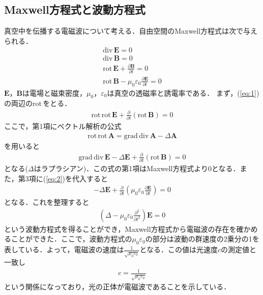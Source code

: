 \documentclass[a4j,10pt,oneside,openany]{jsbook}
\newcommand{\dive}{\mathrm{div}\,}  %
\newcommand{\grad}{\mathrm{grad}\,}  %
\newcommand{\rot}{\mathrm{rot}\,}  %
\newcommand{\vE}{\boldsymbol{E}}
\newcommand{\vB}{\boldsymbol{B}}
\newcommand{\del}{\partial}
\begin{document}
{\subsection{Maxwell方程式と波動方程式}
真空中を伝播する電磁波について考える．自由空間のMaxwell方程式は次で与えられる．
\begin{align}
  \dive \vE = 0\\
  \dive \vB = 0\\
  \rot\vE+\frac{\del\vB}{\del t}=0\label{eq:1}\\
  \rot\vB-\mu_0\varepsilon_0\frac{\del \vE}{\del t}=0\label{eq:2}
\end{align}
$\vE，\vB$は電場と磁束密度，$\mu_0，\varepsilon_0$は真空の透磁率と誘電率である．
まず，(\ref{eq:1})の両辺の$\rot$をとる．
\begin{align}
  \rot\rot\vE+\frac{\del}{\del t}(\rot\vB)=0
\end{align}
ここで，第1項にベクトル解析の公式
\begin{align}
  \rot\rot\boldsymbol{A}=\grad\dive\boldsymbol{A}-\Delta\boldsymbol{A}\label{eq:rotrotA}
\end{align}
を用いると
\begin{align}
  \grad\dive\vE-\Delta\vE+\frac{\del}{\del t}(\rot\vB)=0
\end{align}
となる($\Delta$はラプラシアン)．この式の第1項はMaxwell方程式より0となる．また，第3項に(\ref{eq:2})を代入すると
\begin{align}
  -\Delta\vE+\frac{\del}{\del t}\left(\mu_0\varepsilon_0\frac{\del \vE}{\del t}\right)=0
\end{align}
となる．これを整理すると
\begin{align}
  \left(\Delta-\mu_0\varepsilon_0\frac{\del^2}{\del t^2}\right)\vE=0
\end{align}
という波動方程式を得ることができ，Maxwell方程式から電磁波の存在を確かめることができた．ここで，波動方程式の$\mu_0\varepsilon_0$の部分は波動の群速度の2乗分の1を表している．よって，電磁波の速度は$\frac{1}{\sqrt{\mu_0\varepsilon_0}}$となる．この値は光速度$c$の測定値と一致し
\begin{align}
  c=\frac{1}{\sqrt{\mu_0\varepsilon_0}}
\end{align}
という関係になっており，光の正体が電磁波であることを示している．

}
\end{document}
